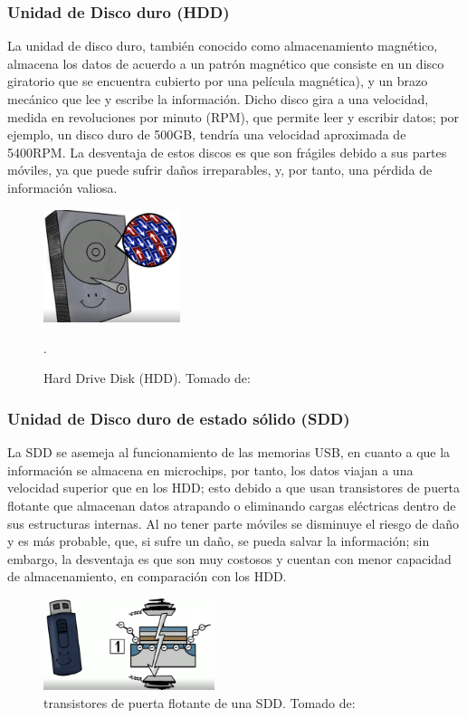 \documentclass{article}
\begin{document}
\subsubsection{Unidad de Disco duro (HDD)}
 La unidad de disco duro, también conocido como almacenamiento magnético, almacena los datos de acuerdo a un patrón magnético que consiste en un disco giratorio que se encuentra cubierto por una película magnética\cite[How computer memory works. 2:57]{TEDwebsite}), y un brazo mecánico que lee y escribe la información. Dicho disco gira a una velocidad, medida en revoluciones por minuto (RPM), que permite leer y escribir datos; por ejemplo, un disco duro de 500GB, tendría una velocidad aproximada de 5400RPM. La desventaja de estos discos es que son frágiles debido a sus partes móviles, ya que puede sufrir daños irreparables, y, por tanto, una pérdida de información valiosa.

\begin{figure}[h]
\includegraphics[width=4cm]{HDD.PNG}
\centering
\caption{Hard Drive Disk (HDD). \centering Tomado de: \cite{TEDwebsite}}.
\label{HDD.PNG}
\end{figure}
\subsubsection{Unidad de Disco duro de estado sólido (SDD)}
La SDD se asemeja al funcionamiento de las memorias USB, en cuanto a que la información se almacena en microchips, por tanto, los datos viajan a una velocidad superior que en los HDD; esto debido a que usan transistores de puerta flotante que almacenan datos atrapando o eliminando cargas eléctricas dentro de sus estructuras internas\cite[How computer memory works. 3:42]{TEDwebsite}. Al no tener parte móviles se disminuye el riesgo de daño y es más probable, que, si sufre un daño, se pueda salvar la información; sin embargo, la desventaja es que son muy costosos y cuentan con menor capacidad de almacenamiento, en comparación con los HDD.


\begin{figure}[h]
\includegraphics[width=5cm]{SDD.PNG}
\centering
\caption{transistores de puerta flotante de una SDD. Tomado de:\cite{TEDwebsite}}
\label{SDD.PNG}
\end{figure}
\newpage
\end{document}
